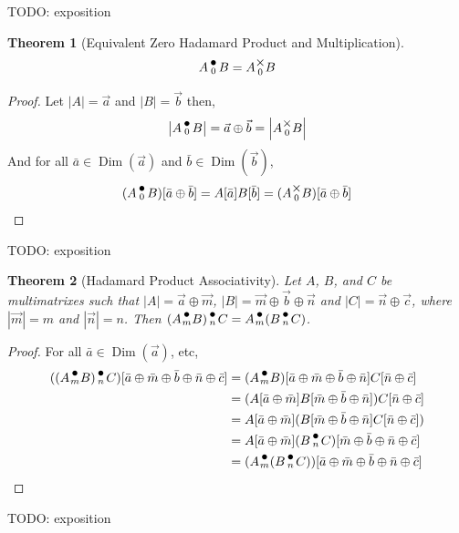 \documentclass[12pt]{book}
\theoremstyle{plain}
\newtheorem{theorem}{Theorem}[chapter]
\theoremstyle{definition}
\theoremstyle{ppart}
\theoremstyle{case}
\theoremstyle{solution}
\DeclareMathOperator{\Dim}{Dim}
\newcommand{\mmult}[1]{\text{\raisebox{1ex}{$\underset{#1}{\times}$}}}
\newcommand{\dmult}[1]{\text{\raisebox{1ex}{$\underset{#1}{\,\bullet\,}$}}}
\newcommand{\shape}[1]{\left|#1\right|}
\begin{document}
TODO: exposition

\begin{theorem}[Equivalent Zero Hadamard Product and Multiplication]
\[ A \dmult{0} B = A \mmult{0} B \]
\end{theorem}
\begin{proof}
Let $\shape{A} = \vec{a}$ and $\shape{B} = \vec{b}$ then,
\[ \shape{A \dmult{0} B} = \vec{a} \oplus \vec{b} = \shape{A \mmult{0} B} \]
And for all $\bar{a} \in \Dim(\vec{a})$ and $\bar{b} \in \Dim(\vec{b})$,
\[ (A \dmult{0} B)[\bar{a} \oplus \bar{b}] = A[\bar{a}] B[\bar{b}] = (A \mmult{0} B)[\bar{a} \oplus \bar{b}] \]
\end{proof}

TODO: exposition

\begin{theorem}[Hadamard Product Associativity]
Let $A$, $B$, and $C$ be multimatrixes such that $\shape{A} = \vec{a} \oplus \vec{m}$,
$\shape{B} = \vec{m} \oplus \vec{b} \oplus \vec{n}$ and $\shape{C} = \vec{n} \oplus \vec{c}$,
where $\shape{\vec{m}} = m$ and $\shape{\vec{n}} = n$.
Then $(A \dmult{m} B) \dmult{n} C = A \dmult{m} (B \dmult{n} C)$.
\end{theorem}
\begin{proof}
For all $\bar{a} \in \Dim(\vec{a})$, etc,
\begin{align*}
((A \dmult{m} B) \dmult{n} C)[\bar{a} \oplus \bar{m} \oplus \bar{b} \oplus \bar{n} \oplus \bar{c}]
  &= (A \dmult{m} B)[\bar{a} \oplus \bar{m} \oplus \bar{b} \oplus \bar{n}] C[\bar{n} \oplus \bar{c}] \\
  &= (A[\bar{a} \oplus \bar{m}] B[\bar{m} \oplus \bar{b} \oplus \bar{n}]) C[\bar{n} \oplus \bar{c}] \\
  &= A[\bar{a} \oplus \bar{m}] (B[\bar{m} \oplus \bar{b} \oplus \bar{n}] C[\bar{n} \oplus \bar{c}]) \\
  &= A[\bar{a} \oplus \bar{m}] (B \dmult{n} C)[\bar{m} \oplus \bar{b} \oplus \bar{n} \oplus \bar{c}] \\
  &= (A \dmult{m} (B \dmult{n} C))[\bar{a} \oplus \bar{m} \oplus \bar{b} \oplus \bar{n} \oplus \bar{c}]
\end{align*}
\end{proof}

TODO: exposition
\end{document}
